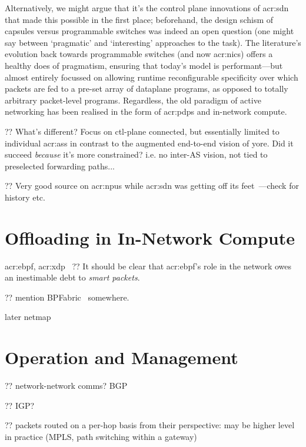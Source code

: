 Alternatively, we might argue that it's the control plane innovations of \gls{acr:sdn} that made this possible in the first place; beforehand, the design schism of capsules versus programmable switches was indeed an open question (one might say between `pragmatic' and `interesting' approaches to the task).
The literature's evolution back towards programmable switches (and now \glspl{acr:nic}) offers a healthy does of pragmatism, ensuring that today's model is performant---but almost entirely focussed on allowing runtime reconfigurable specificity over which packets are fed to a pre-set array of dataplane programs, as opposed to totally arbitrary packet-level programs.
Regardless, the old paradigm of active networking has been realised in the form of \glspl{acr:pdp} and in-network compute.

?? What's different? Focus on ctl-plane connected, but essentially limited to individual \glspl{acr:as} in contrast to the augmented end-to-end vision of yore. Did it succeed \emph{because} it's more constrained? i.e. no inter-AS vision, not tied to preselected forwarding paths...

?? Very good source on \glspl{acr:npu} while \gls{acr:sdn} was getting off its feet~\parencite{npu-book}---check for history etc.


\section{Offloading in In-Network Compute}

\gls{acr:ebpf}, \gls{acr:xdp}~\parencite{DBLP:conf/conext/Hoiland-Jorgensen18}
?? It should be clear that \gls{acr:ebpf}'s role in the network owes an inestimable debt to \emph{smart packets}.

?? mention BPFabric~\parencite{DBLP:conf/ancs/JouetP17} somewhere.

later netmap~\parencite{DBLP:conf/usenix/Rizzo12}

\section{Operation and Management}

?? network-network comms? BGP

?? IGP?

?? packets routed on a per-hop basis from their perspective: may be higher level in practice (MPLS, path switching within a gateway)

